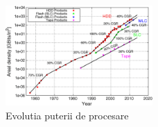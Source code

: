 \begin{figure}
	\centering
	\includegraphics[width=0.5\textwidth]{memory_trends}
	\caption{Evolutia puterii de procesare\cite{memory_trends} }
	\label{fig:memory_trends}
\end{figure}

